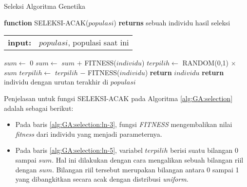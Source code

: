 \begin{algorithm}[H]
	\caption{Seleksi Algoritma Genetika}
	\label{alg:GA:selection}
	\begin{flushleft}
		\textbf{function} SELEKSI-ACAK($populasi$) \textbf{returns} sebuah individu hasil seleksi
		\begin{flushleft}
			\begin{tabular}{ l l }
				\textbf{input:}& $populasi$, populasi saat ini
				\hspace{5pt} 
			\end{tabular} 
		\end{flushleft}
	\end{flushleft}
	
	\begin{algorithmic}[1]
		\STATE $sum \leftarrow$ 0 \label{alg:GA:selection:ln-1}
		 \label{alg:GA:selection:ln-2}
			\STATE $sum \leftarrow$ $sum$ $+$ FITNESS($individu$) \label{alg:GA:selection:ln-3}
		\ENDFOR \label{alg:GA:selection:ln-4}
		\STATE $terpilih \leftarrow$ RANDOM(0,1) $\times$ $sum$ \label{alg:GA:selection:ln-5}
		 \label{alg:GA:selection:ln-6}
			\STATE $terpilih \leftarrow$ $terpilih$ $-$ FITNESS($individu$) \label{alg:GA:selection:ln-7}
			 \label{alg:GA:selection:ln-8}
				\STATE \textbf{return}  $individu$ \label{alg:GA:selection:ln-9}
			\ENDIF \label{alg:GA:selection:ln-10}
		\ENDFOR \label{alg:GA:selection:ln-11}
		\STATE \textbf{return}  individu dengan urutan terakhir di $populasi$ \label{alg:GA:selection:ln-12}
	\end{algorithmic}
\end{algorithm}

Penjelasan untuk fungsi SELEKSI-ACAK pada Algoritma \ref{alg:GA:selection} adalah sebagai berikut:
\begin{itemize}
	\item Pada baris \ref{alg:GA:selection:ln-3}, fungsi \textit{FITNESS} mengembalikan nilai \textit{fitness} dari individu yang menjadi parameternya.
	\item Pada baris \ref{alg:GA:selection:ln-5}, variabel $terpilih$ berisi suatu bilangan 0 sampai $sum$. Hal ini dilakukan dengan cara mengalikan sebuah bilangan riil dengan $sum$. Bilangan riil tersebut merupakan bilangan antara 0 sampai 1 yang dibangkitkan secara acak dengan distribusi \textit{uniform}.
\end{itemize}

